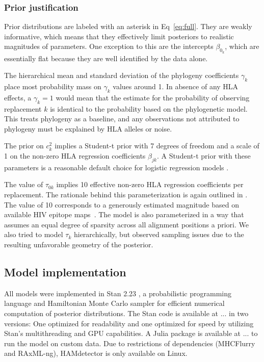 \documentclass{bioinfo}
\begin{document}
\begin{methods}
\subsubsection{Prior justification}

Prior distributions are labeled with an asterisk in Eq~\ref{eq:full}. They are weakly informative, which means that they effectively limit posteriors to realistic magnitudes of parameters. One exception to this are the intercepts \(\beta_{0_k}\), which are essentially flat because they are well identified by the data alone. 

The hierarchical mean and standard deviation of the phylogeny coefficients \(\gamma_k\) place most probability mass on \(\gamma_k\) values around 1. In absence of any HLA effects, a $\gamma_k=1$ would mean that the estimate for the probability of observing replacement $k$ is identical to the probability based on the phylogenetic model. This treats phylogeny as a baseline, and any observations not attributed to phylogeny must be explained by HLA alleles or noise.

The prior on $c_k^2$ implies a Student-t prior with 7 degrees of freedom and a scale of 1 on the non-zero HLA regression coefficients \(\beta_{jk}\). A Student-t prior with these parameters is a reasonable default choice for logistic regression models \citep{Piironen2017}.

The value of \(\tau_{0k}\) implies 10 effective non-zero HLA regression coefficients per replacement. The rationale behind this parameterization is again outlined in \citet{Piironen2017}. The value of 10 corresponds to a generously estimated magnitude based on available HIV epitope maps~\citep{immunology2018editors}.
The model is also parameterized in a way that assumes an equal degree of sparsity across all alignment positions a priori. We also tried to model \(\tau_k\) hierarchically, but observed sampling issues due to the resulting unfavorable geometry of the posterior.


\subsection{Model implementation}
All models were implemented in Stan 2.23 \citep{Stan2021}, a probabilistic programming language and Hamiltonian Monte Carlo sampler for efficient numerical computation of posterior distributions. The Stan code is available at ... in two versions: One optimized for readability and one optimized for speed by utilizing Stan's multithreading and GPU capabilities. A Julia \citep{Bezanson2017} package is available at ... to run the model on custom data. Due to restrictions of dependencies (MHCFlurry and RAxML-ng), HAMdetector is only available on Linux. %



\end{methods}
\end{document}
